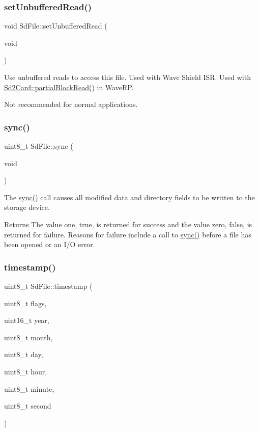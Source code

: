 \subsubsection{\texorpdfstring{set\+Unbuffered\+Read()}{setUnbufferedRead()}}
{\footnotesize\ttfamily void Sd\+File\+::set\+Unbuffered\+Read (\begin{DoxyParamCaption}\item[{void}]{ }\end{DoxyParamCaption})\hspace{0.3cm}{\ttfamily [inline]}}

Use unbuffered reads to access this file. Used with Wave Shield I\+SR. Used with \hyperlink{class_sd2_card_af3de0f1fdfc86816f45b555841ff291b}{Sd2\+Card\+::partial\+Block\+Read()} in Wave\+RP.

Not recommended for normal applications. \mbox{\label{class_sd_file_a742d64ca964583ac3a92b31f0eba5e14}} 
\subsubsection{\texorpdfstring{sync()}{sync()}}
{\footnotesize\ttfamily uint8\+\_\+t Sd\+File\+::sync (\begin{DoxyParamCaption}\item[{void}]{ }\end{DoxyParamCaption})}

The \hyperlink{class_sd_file_a742d64ca964583ac3a92b31f0eba5e14}{sync()} call causes all modified data and directory fields to be written to the storage device.

\begin{DoxyReturn}{Returns}
The value one, true, is returned for success and the value zero, false, is returned for failure. Reasons for failure include a call to \hyperlink{class_sd_file_a742d64ca964583ac3a92b31f0eba5e14}{sync()} before a file has been opened or an I/O error. 
\end{DoxyReturn}
\mbox{\label{class_sd_file_a249632ba9580c556c0b041d6b2aaf224}} 
\subsubsection{\texorpdfstring{timestamp()}{timestamp()}}
{\footnotesize\ttfamily uint8\+\_\+t Sd\+File\+::timestamp (\begin{DoxyParamCaption}\item[{uint8\+\_\+t}]{flags,  }\item[{uint16\+\_\+t}]{year,  }\item[{uint8\+\_\+t}]{month,  }\item[{uint8\+\_\+t}]{day,  }\item[{uint8\+\_\+t}]{hour,  }\item[{uint8\+\_\+t}]{minute,  }\item[{uint8\+\_\+t}]{second }\end{DoxyParamCaption})}

